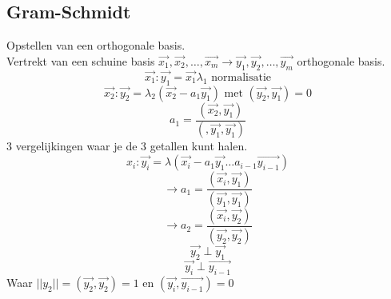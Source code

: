 \subsection{Gram-Schmidt}
Opstellen van een orthogonale basis. \\
Vertrekt van een schuine basis $\vec{x_1},\vec{x_2},\ldots,\vec{x_m} \rightarrow \vec{y_1},\vec{y_2},\ldots,\vec{y_m}$ orthogonale basis.
\begin{equation*}
\vec{x_1}:\vec{y_1} = \vec{x_1}\lambda_1 \text{ normalisatie}
\end{equation*}
\begin{equation*}
\vec{x_2}:\vec{y_2}=\lambda_2(\vec{x_2}-a_1\vec{y_1}) \text{ met } (\vec{y_2},\vec{y_1})=0
\end{equation*}
\begin{equation*}
a_1 = \frac{(\vec{x_2},\vec{y_1})}{(,\vec{y_1},\vec{y_1})}
\end{equation*}
3 vergelijkingen waar je de 3 getallen kunt halen.
\begin{equation*}
x_i : \vec{y_i} = \lambda (\vec{x_i}-a_1\vec{y_1}\ldots a_{i-1}\vec{y_{i-1}})
\end{equation*}
\begin{equation*}
\rightarrow a_1 = \frac{(\vec{x_i},\vec{y_1})}{(\vec{y_1},\vec{y_1})}
\end{equation*}
\begin{equation*}
\rightarrow a_2 = \frac{(\vec{x_i},\vec{y_2})}{(\vec{y_2},\vec{y_2})}
\end{equation*}
\begin{equation*}
\vec{y_2} \perp \vec{y_1}
\end{equation*}
\begin{equation*}
\vec{y_i} \perp \vec{y_{i-1}}
\end{equation*}
Waar $ || y_2||= ( \vec{y_2},\vec{y_2})=1 $ en $ (\vec{y_i},\vec{y_{i-1}})=0$

